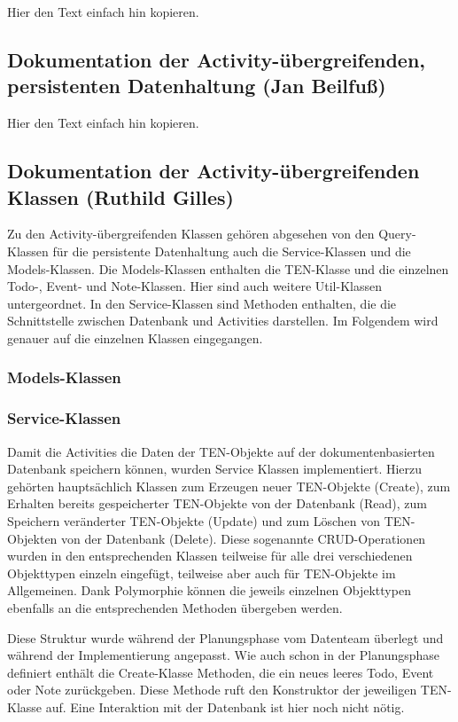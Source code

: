 Hier den Text einfach hin kopieren.

\subsection{Dokumentation der Activity-übergreifenden, persistenten Datenhaltung (Jan Beilfuß)}

Hier den Text einfach hin kopieren.

\newpage
\subsection{Dokumentation der Activity-übergreifenden Klassen (Ruthild Gilles)}

Zu den Activity-übergreifenden Klassen gehören abgesehen von den Query-Klassen für die persistente Datenhaltung auch die Service-Klassen und die Models-Klassen. Die Models-Klassen enthalten die TEN-Klasse und die einzelnen Todo-, Event- und Note-Klassen. Hier sind auch weitere Util-Klassen untergeordnet. In den Service-Klassen sind Methoden enthalten, die die Schnittstelle zwischen Datenbank und Activities darstellen. Im Folgendem wird genauer auf die einzelnen Klassen eingegangen.

\subsubsection{Models-Klassen}

\subsubsection{Service-Klassen}

Damit die Activities die Daten der TEN-Objekte auf der dokumentenbasierten Datenbank speichern können, wurden Service Klassen implementiert. Hierzu gehörten hauptsächlich Klassen zum Erzeugen neuer TEN-Objekte (Create), zum Erhalten bereits gespeicherter TEN-Objekte von der Datenbank (Read), zum Speichern veränderter TEN-Objekte (Update) und zum Löschen von TEN-Objekten von der Datenbank (Delete). Diese sogenannte CRUD-Operationen wurden in den entsprechenden Klassen teilweise für alle drei verschiedenen Objekttypen einzeln eingefügt, teilweise aber auch für TEN-Objekte im Allgemeinen. Dank Polymorphie können die jeweils einzelnen Objekttypen ebenfalls an die entsprechenden Methoden übergeben werden.

Diese Struktur wurde während der Planungsphase vom Datenteam überlegt und während der Implementierung angepasst. Wie auch schon in der Planungsphase definiert enthält die Create-Klasse Methoden, die ein neues leeres Todo, Event oder Note zurückgeben. Diese Methode ruft den Konstruktor der jeweiligen TEN-Klasse auf. Eine Interaktion mit der Datenbank ist hier noch nicht nötig.


